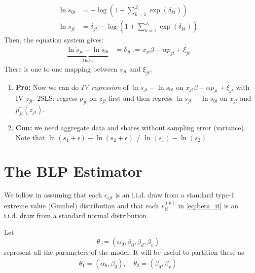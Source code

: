 \documentclass[11pt]{elegantbook}
\begin{document}
\begin{enumerate}
\begin{example}
\begin{equation}
\begin{aligned}
                \ln s_{0t}&=-\log\left(1+\sum_{k=1}^{J_t}\exp(\delta_{kt})\right)\\
                \ln s_{jt}&=\delta_{jt}-\log\left(1+\sum_{k=1}^{J_t}\exp(\delta_{kt})\right)
            \end{aligned}
            \nonumber
        \end{equation}
        Then, the equation system gives:
        \begin{equation}
            \begin{aligned}
                \underbrace{\ln \tilde{s}_{jt}-\ln \tilde{s}_{0t}}_\text{Data}&=\delta_{jt}:= x_{jt}\beta-\alpha p_{jt}+\xi_{jt}
            \end{aligned}
            \nonumber
        \end{equation}
        There is one to one mapping between $s_{jt}$ and $\xi_{jt}$.
    \end{example}
\end{enumerate}

\begin{enumerate}
    \item \textbf{Pro:} Now we can do \textit{IV regression} of $\ln s_{jt}-\ln s_{0t}$ on $x_{jt}\beta-\alpha p_{jt}+\xi_{jt}$ with IV $z_{jt}$. 2SLS: regress $p_{jt}$ on $z_{jt}$ first and then regress $\ln s_{jt}-\ln s_{0t}$ on $x_{jt}$ and $\hat{p_{jt}}(z_{jt})$.
    \item \textbf{Con:} we need aggregate data and shares without sampling error (variance). Note that $\ln(s_1+\epsilon)-\ln(s_2+\epsilon)\neq \ln(s_1)-\ln(s_2)$
\end{enumerate}


\section{The BLP Estimator}
We follow \cite{berry1995automobile} in assuming that each $\epsilon_{ijt}$ is an i.i.d. draw from a standard type-1 extreme value (Gumbel) distribution and that each $v_{it}^{(k)}$ in \eqref{eq:beta_it} is an i.i.d. draw from a standard normal distribution.

Let $$\theta:=(\alpha_0,\beta_0,\beta_d,\beta_v)$$
represent all the parameters of the model. It will be useful to partition these as
\begin{equation}
    \begin{aligned}
        \theta_1=(\alpha_0,\beta_0),\quad \theta_2=(\beta_d,\beta_v)
    \end{aligned}
    \nonumber
\end{equation}






\end{document}

